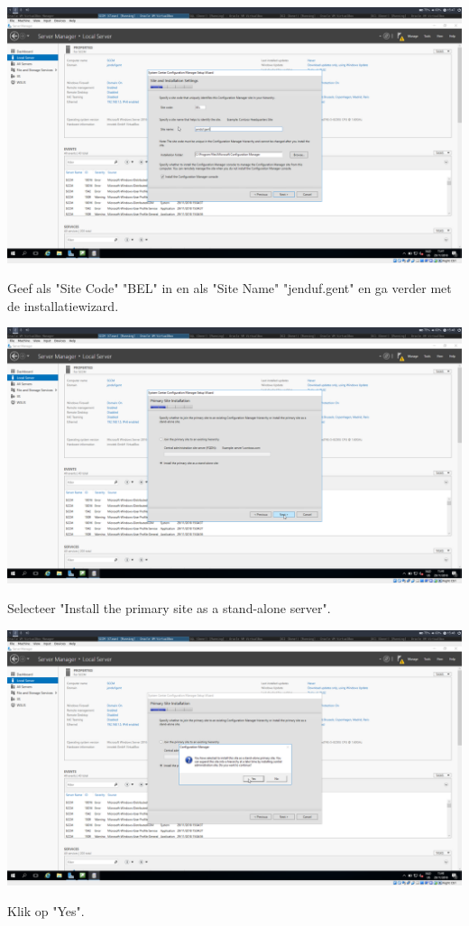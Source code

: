 \documentclass[a4paper]{article}
\begin{document}
\begin{center}
\includegraphics[width=15cm]{Pictures/SCCM/6/1543502871.png}

Geef als "Site Code" "BEL" in en als "Site Name" "jenduf.gent" en ga verder met de installatiewizard.
\end{center}
\begin{center}
\includegraphics[width=15cm]{Pictures/SCCM/6/1543502888.png}

Selecteer "Install the primary site as a stand-alone server".
\end{center}
\begin{center}
\includegraphics[width=15cm]{Pictures/SCCM/6/1543502894.png}

Klik op "Yes".
\end{center}
\end{document}
